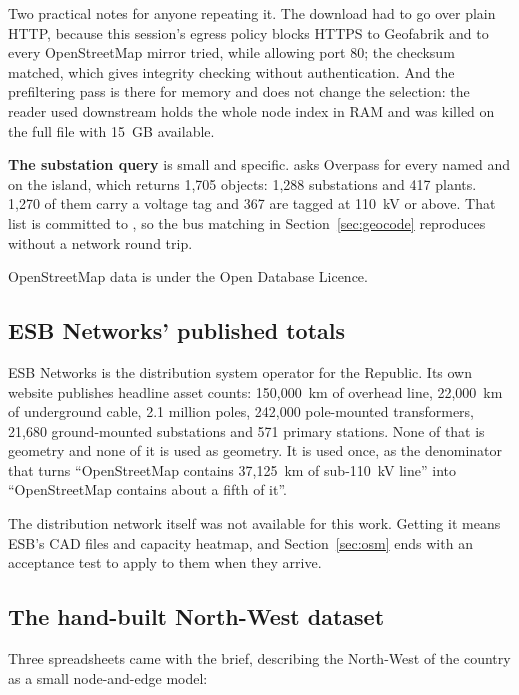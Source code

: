 \documentclass[11pt,a4paper]{article}
\begin{document}
Two practical notes for anyone repeating it. The download had to go over plain
HTTP, because this session's egress policy blocks HTTPS to Geofabrik and to
every OpenStreetMap mirror tried, while allowing port 80; the checksum matched,
which gives integrity checking without authentication. And the prefiltering
pass is there for memory and does not change the selection: the reader used
downstream holds the whole node index in RAM and was killed on the full file
with 15~GB available.

\textbf{The substation query} is small and specific.  asks
Overpass for every named  and  on the
island, which returns 1{,}705 objects: 1{,}288 substations and 417 plants.
1{,}270 of them carry a voltage tag and 367 are tagged at 110~kV or above.
That list is committed to , so the bus
matching in Section~\ref{sec:geocode} reproduces without a network round trip.

OpenStreetMap data is under the Open Database Licence.

\subsection{ESB Networks' published totals}

ESB Networks is the distribution system operator for the Republic. Its own
website publishes headline asset counts: 150{,}000~km of overhead line,
22{,}000~km of underground cable, 2.1 million poles, 242{,}000 pole-mounted
transformers, 21{,}680 ground-mounted substations and 571 primary stations. None of that is geometry and none of it is used as
geometry. It is used once, as the denominator that turns ``OpenStreetMap
contains 37{,}125~km of sub-110~kV line'' into ``OpenStreetMap contains about a
fifth of it''.

The distribution network itself was not available for this work. Getting it
means ESB's CAD files and capacity heatmap, and Section~\ref{sec:osm} ends with
an acceptance test to apply to them when they arrive.

\subsection{The hand-built North-West dataset}

Three spreadsheets came with the brief, describing the North-West of the
country as a small node-and-edge model:
\end{document}
